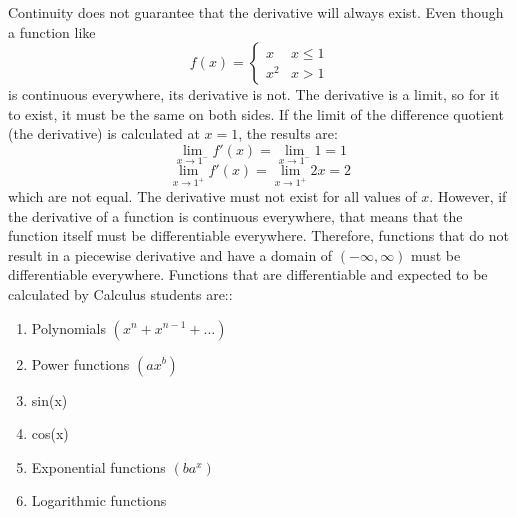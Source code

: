\documentclass[../revisedmain.tex]{subfiles}
\begin{document}
	Continuity does not guarantee that the derivative will always exist. Even though a function like
	\[
	f(x)=
	\begin{cases}
	x & x\leq 1\\
	x^2 & x>1 
	\end{cases}
	\]
	is continuous everywhere, its derivative is not. The derivative is a limit, so for it to exist, it must be the same on both sides. If the limit of the difference quotient (the derivative) is calculated at $x=1$, the results are:
	$$\lim_{x\to 1^-} f'(x) = \lim_{x\to 1^-} 1 = 1$$
	$$\lim_{x\to 1^+} f'(x)= \lim_{x\to 1^+} 2x = 2$$
	which are not equal. The derivative must not exist for all values of $x$. However, if the derivative of a function is continuous everywhere, that means that the function itself must be differentiable everywhere. Therefore, functions that do not result in a piecewise derivative and have a domain of $(-\infty,\infty)$ must be differentiable everywhere. Functions that are differentiable and expected to be calculated by Calculus students are::
	\begin{enumerate}
		\item Polynomials $(x^n+x^{n-1}+...)$
		\item Power functions $(ax^b)$
		\item sin(x)
		\item cos(x)
		\item Exponential functions $(ba^x)$
		\item Logarithmic functions
		\end{enumerate}
\end{document}
